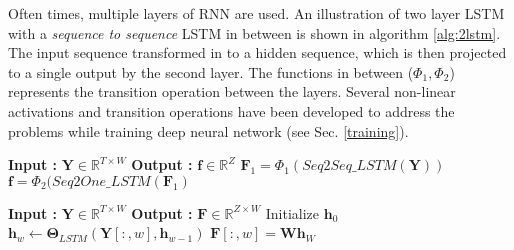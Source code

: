\noindent Often times, multiple layers of RNN are used. An illustration of  two layer LSTM with a \textit{sequence to sequence} LSTM in between is shown in algorithm \ref{alg:2lstm}. The input sequence transformed in to a hidden sequence, which is then projected to a single output by the second layer. The functions in between ($\Phi_{1}, \Phi_{2}$) represents the transition operation between the layers. Several non-linear activations and transition operations have been developed to address the problems while training deep neural network (see Sec. \ref{training}). 
  
\begin{minipage}[t]{7.5cm}
  \vspace{0pt}  
\begin{algorithm}[H]
  \caption{$\textbf{f}$ = $LSTM2(\textbf{Y})$}\label{alg:2lstm}
  \begin{algorithmic}[1]
    \Statex \textbf{Input :} $\textbf{Y} \in \mathbb{R}^{T \times W}$
    \Statex \textbf{Output :} $\textbf{f} \in \mathbb{R}^{Z}$
    \Statex
    \Statex
    \Statex
    \State $\textbf{F}_{1} = \Phi_{1}(Seq2Seq\_LSTM(\textbf{Y}))$
    \State $\textbf{f} = \Phi_{2}(Seq2One\_LSTM(\textbf{F}_{1})$
  \end{algorithmic}
\end{algorithm}
\end{minipage}%
\begin{minipage}[t]{7.5cm}
  \vspace{0pt}
\begin{algorithm}[H]
  \caption{$\textbf{F}$ = $Seq2Seq\_LSTM$($\textbf{Y}$) }\label{alg:s2slstm}
  \begin{algorithmic}[1]
    \Statex \textbf{Input :} $\textbf{Y} \in \mathbb{R}^{T \times W}$
    \Statex \textbf{Output :} $\textbf{F} \in \mathbb{R}^{Z \times W}$
    \State Initialize $\textbf{h}_{0}$
    \State  $\textbf{h}_{w} \leftarrow \bm{\Theta}_{LSTM}(\textbf{Y}[:,w],\textbf{h}_{w-1})$
    \State $\textbf{F}[:,w] = \textbf{W}\textbf{h}_{W}$
    \EndFor
  \end{algorithmic}
\end{algorithm}
\end{minipage}
\FloatBarrier

